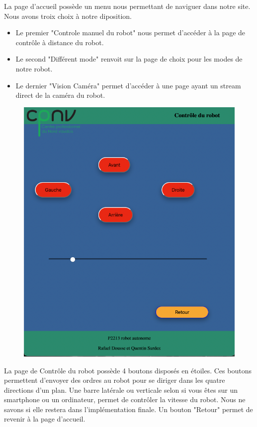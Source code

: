 \documentclass[
	a4paper,									%
	11pt,										%
	twoside,									%
	openright,									%
	notitlepage,									%
	parskip=half,								%
]{scrreprt}										%
\begin{document}
La page d'accueil possède un menu nous permettant de naviguer dans notre site. Nous avons troix choix à notre diposition. 
\begin{itemize}
 \item Le premier "Controle manuel du robot" nous permet d'accéder à la page de contrôle à distance du robot. 
 \item Le second "Différent mode" renvoit sur la page de choix pour les modes de notre robot. 
 \item Le dernier "Vision Caméra" permet d'accéder à une page ayant un stream direct de la caméra du robot.
\end{itemize}

\newpage


\begin{figure}[!ht]
	\centering
	\includegraphics[scale=.5]{img/Controle_Robot.png}
	\vspace{.5cm}
	\label{Controle}
\end{figure}

La page de Contrôle du robot possède 4 boutons disposés en étoiles. Ces boutons permettent 
d'envoyer des ordres au robot pour se diriger dans les quatre directions d'un plan. Une barre 
latérale ou verticale selon si vous êtes sur un smartphone ou un ordinateur, permet de contrôler 
la vitesse du robot. Nous ne savons si elle restera dans l'implémentation finale. Un bouton "Retour"
permet de revenir à la page d'accueil. \par
\end{document}
